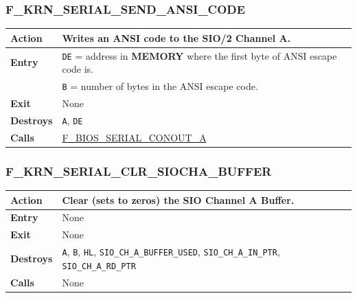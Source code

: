 \documentclass[a4paper,11pt]{article}
\begin{document}
        \subsubsection{F\_KRN\_SERIAL\_SEND\_ANSI\_CODE}
        \label{func:fkrnserialsendansicode}
        \begin{tabular}{l p{9cm}}
            \hline\textbf{Action}
            & Writes an ANSI code to the \textbf{SIO/2} Channel A. \\
            \hline\textbf{Entry}
            & \texttt{DE} = address in \textbf{MEMORY} where the first byte of
            ANSI escape code is.\\
            & \texttt{B} = number of bytes in the ANSI escape code.\\
            \hline\textbf{Exit} & None \\
            \hline\textbf{Destroys} & \texttt{A}, \texttt{DE} \\
            \hline\textbf{Calls}
            & \hyperref[func:fbiosserialconouta]{F\_BIOS\_SERIAL\_CONOUT\_A}\\
            \hline
        \end{tabular}

        \subsubsection{F\_KRN\_SERIAL\_CLR\_SIOCHA\_BUFFER}
        \label{func:fkrnserialclrsiochabuffer}
        \begin{tabular}{l p{9cm}}
            \hline\textbf{Action}
            & Clear (sets to zeros) the SIO Channel A Buffer. \\
            \hline\textbf{Entry} & None\\
            \hline\textbf{Exit} & None \\
            \hline\textbf{Destroys} & \texttt{A}, \texttt{B}, \texttt{HL},
            \texttt{SIO\_CH\_A\_BUFFER\_USED}, \texttt{SIO\_CH\_A\_IN\_PTR},
            \texttt{SIO\_CH\_A\_RD\_PTR}\\
            \hline\textbf{Calls} & None\\
            \hline
        \end{tabular}

\end{document}
